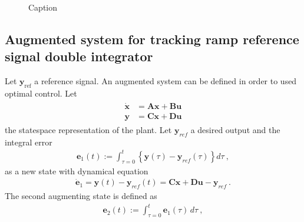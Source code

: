 \documentclass[letterpaper,10pt,english]{jupyterBook}
\begin{document}
\begin{figure}[htbp]
\centering
\capstart

\noindent{}
\caption{Caption}\label{\detokenize{ch/control/optimal-control-ref-tracking:fig-optimal-tracking-step}}\end{figure}


\subsection{Augmented system for tracking ramp reference signal \sphinxhyphen{} double integrator}
\label{\detokenize{ch/control/optimal-control-ref-tracking:augmented-system-for-tracking-ramp-reference-signal-double-integrator}}\label{\detokenize{ch/control/optimal-control-ref-tracking:control-optimal-ref-tracking-ramp}}
\sphinxAtStartPar
Let \(\mathbf{y}_{\text{ref}}\) a reference signal. An augmented system can be defined in order to used optimal control. Let
\begin{equation*}
\begin{split}\begin{aligned}
 \dot{\mathbf{x}} & = \mathbf{A} \mathbf{x} + \mathbf{B} \mathbf{u} \\
      \mathbf{y}  & = \mathbf{C} \mathbf{x} + \mathbf{D} \mathbf{u}
\end{aligned}\end{split}
\end{equation*}
\sphinxAtStartPar
the state\sphinxhyphen{}space representation of the plant. Let \(\mathbf{y}_{ref}\) a desired output and the integral error
\begin{equation*}
\begin{split}\mathbf{e}_1(t) := \int_{\tau=0}^{t} \left\{ \mathbf{y}(\tau) - \mathbf{y}_{ref}(\tau) \right\} d \tau \ ,\end{split}
\end{equation*}
\sphinxAtStartPar
as a new state with dynamical equation
\begin{equation*}
\begin{split}\dot{\mathbf{e}}_1 = \mathbf{y}(t) - \mathbf{y}_{ref}(t) = \mathbf{C} \mathbf{x} + \mathbf{D} \mathbf{u} - \mathbf{y}_{ref} \ .\end{split}
\end{equation*}
\sphinxAtStartPar
The second augmenting state is defined as
\begin{equation*}
\begin{split}\mathbf{e}_2(t) := \int_{\tau=0}^{t} \mathbf{e}_1(\tau) \, d\tau \ ,\end{split}
\end{equation*}
\end{document}
